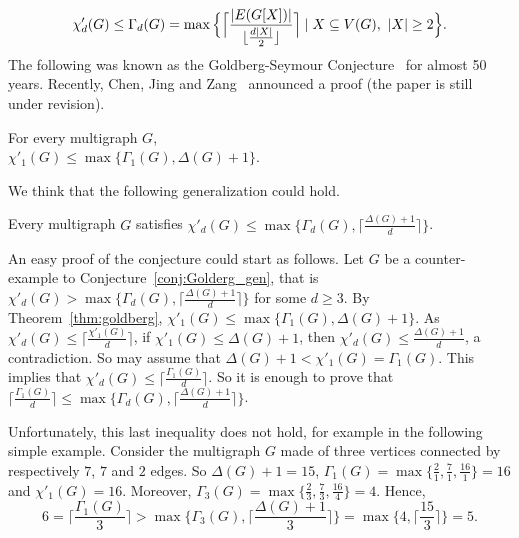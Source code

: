 $$
    \chi'_d(G) \leq \Gamma_d(G) = 
    \max 
    \Big\{ \Bigl\lceil \frac{|E(G[X])|}{\lfloor \frac{d|X|}{2}\rfloor} \Bigr\rceil \mid X \subseteq V(G),\ |X| \geq 2 \Big\}.
$$
The following was known as the Goldberg-Seymour Conjecture~\cite{G73, S79} for almost 50 years. Recently, Chen, Jing and Zang~\cite{CJZ19} announced a proof (the paper is still under revision).

\begin{theorem}\label{thm:goldberg}  
For every multigraph $G$,\\ $\chi'_1(G) \leq \max\{\Gamma_1(G), \Delta(G) + 1\}$. 
\end{theorem}

We think that the following generalization could hold. 

\begin{conjecture}\label{conj:Golderg_gen}
Every multigraph $G$ satisfies $\chi'_d(G) \leq \max\{\Gamma_d(G), \lceil \frac{\Delta(G) +1}{d} \rceil\}$.
\end{conjecture}

An easy proof of the conjecture could start as follows. Let $G$ be a counter-example to Conjecture~\ref{conj:Golderg_gen}, that is $\chi'_d(G) > \max\{\Gamma_d(G), \lceil \frac{\Delta(G) +1}{d} \rceil\}$ for some $d \geq 3$.  
By Theorem~\ref{thm:goldberg}, $\chi'_1(G) \leq \max\{\Gamma_1(G), \Delta(G) + 1\}$. 
As $\chi'_d(G) \leq \lceil \frac{\chi'_1(G)}{d} \rceil$, if $\chi'_1(G) \leq \Delta(G) +1$, then $\chi'_d(G) \leq \frac{\Delta(G) +1}{d}$, a contradiction.  
So may assume that $\Delta(G) +1 < \chi'_1(G) = \Gamma_1(G)$. 
This implies that $\chi'_d(G) \leq \lceil \frac{\Gamma_1(G)}{d} \rceil$. 
So it is enough to prove that $\lceil \frac{\Gamma_1(G)}{d} \rceil \leq \max\{\Gamma_d(G), \lceil \frac{\Delta(G) +1}{d} \rceil\}$. 

Unfortunately, this last inequality does not hold, for example in the following simple example.  
Consider the multigraph $G$ made of three vertices connected by respectively $7$, $7$ and $2$ edges. So $\Delta(G) + 1 = 15$, $\Gamma_1(G) = \max\{ \frac{2}{1},\frac{7}{1},\frac{16}{1}\} = 16$ and $\chi'_1(G) = 16$.
Moreover, $\Gamma_3(G) = \max\{ \frac{2}{3}, \frac{7}{3}, \frac{16}{4}\} = 4$. 
Hence, 
$$6 = \Big\lceil \frac{\Gamma_1(G)}{3} \Big\rceil >  \max \Big\{\Gamma_3(G), \Big\lceil \frac{\Delta(G) +1}{3} \Big\rceil \Big\} = \max \Big\{4, \Big\lceil \frac{15}{3} \Big\rceil \Big\} =5. $$


